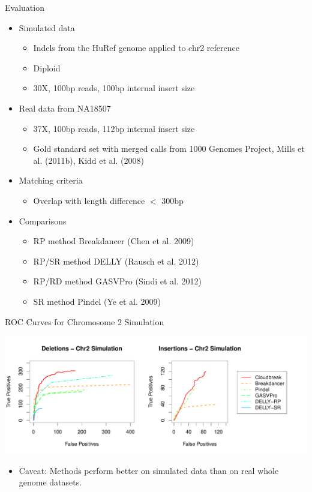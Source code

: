 \documentclass{beamer}
\begin{document}
\begin{frame}{Evaluation}
\begin{itemize}
\item Simulated data
\begin{itemize}
\item Indels from the HuRef genome applied to chr2 reference
\item Diploid
\item 30X, 100bp reads, 100bp internal insert size
\end{itemize}
\item Real data from NA18507
\begin{itemize}
\item 37X, 100bp reads, 112bp internal insert size
\item Gold standard set with merged calls from 1000 Genomes Project, Mills et al. (2011b), Kidd
  et al. (2008)
\end{itemize}
\item Matching criteria
\begin{itemize}
\item Overlap with length difference $<$ 300bp
\end{itemize}
\item Comparisons
\begin{itemize}
  \item RP method Breakdancer (Chen et al. 2009)
   \item RP/SR method DELLY (Rausch et al. 2012)
   \item  RP/RD method GASVPro (Sindi et al. 2012)
   \item SR method Pindel (Ye et al. 2009) 
\end{itemize}
\end{itemize}
\end{frame}

\begin{frame}{ROC Curves for Chromosome 2 Simulation}
\begin{center}
\includegraphics[trim=0 25 0 25, clip, width=1\textwidth]{CHR2SIM_ROC_COMBINED_ROCS_POSTER.pdf}
\end{center}
\begin{itemize}
  \item Caveat: Methods perform better on simulated data than on real
    whole genome datasets.
\end{itemize}
\end{frame}
\end{document}
